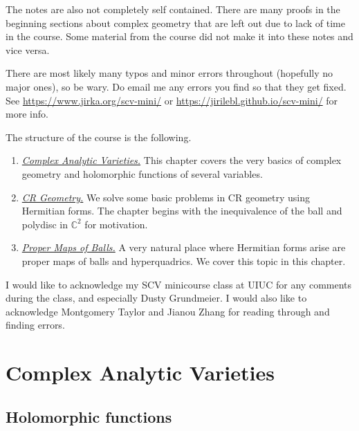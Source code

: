 \documentclass[12pt,openany]{book}
\newcommand{\C}{{\mathbb{C}}}
\theoremstyle{plain}
\theoremstyle{remark}
\theoremstyle{definition}
\theoremstyle{exercise}
\theoremstyle{example}
\begin{document}
The notes are also not completely self contained.  There are many proofs
in the beginning sections about complex geometry that are left
out due to lack of time in the course.  Some material from the course did not
make it into these notes and vice versa.

There are most likely many typos and minor errors throughout (hopefully no
major ones), so be wary.  Do email me any errors you find so that they get
fixed.
See \url{https://www.jirka.org/scv-mini/} or
\url{https://jirilebl.github.io/scv-mini/}
for more info.

The structure of the course is the following.

\begin{enumerate}
\item \emph{\hyperref[cav:chapter]{Complex Analytic Varieties.}}  This chapter covers the very
basics of complex geometry and holomorphic functions of several variables.
\item \emph{\hyperref[cr:chapter]{CR Geometry.}}  We solve some basic problems in CR geometry using
Hermitian forms.  The chapter begins with the inequivalence of the ball and
polydisc in $\C^2$ for motivation.
\item \emph{\hyperref[proper:chapter]{Proper Maps of Balls.}}  A very natural place where Hermitian
forms arise are proper maps of balls and hyperquadrics.  We cover this topic
in this chapter.
\end{enumerate}

I would like to acknowledge my SCV minicourse class at UIUC for any comments
during the class, and especially Dusty Grundmeier.  I would also like to
acknowledge Montgomery Taylor and Jianou Zhang for reading through and finding errors.


\chapter{Complex Analytic Varieties} \label{cav:chapter}


\section{Holomorphic functions} \label{sec:holfunc}
\end{document}
